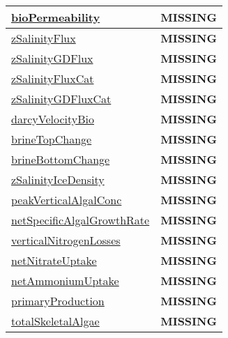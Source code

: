 {\begin{center}
\begin{longtable}{| p{2.0in} | p{4.0in} |}
    \hline
    \hyperref[subsec:var_sec_biogeochemistry_bioPermeability]{bioPermeability} & {\bf \color{red} MISSING} \\
    \hline
    \hyperref[subsec:var_sec_biogeochemistry_zSalinityFlux]{zSalinityFlux} & {\bf \color{red} MISSING} \\
    \hline
    \hyperref[subsec:var_sec_biogeochemistry_zSalinityGDFlux]{zSalinityGDFlux} & {\bf \color{red} MISSING} \\
    \hline
    \hyperref[subsec:var_sec_biogeochemistry_zSalinityFluxCat]{zSalinityFluxCat} & {\bf \color{red} MISSING} \\
    \hline
    \hyperref[subsec:var_sec_biogeochemistry_zSalinityGDFluxCat]{zSalinityGDFluxCat} & {\bf \color{red} MISSING} \\
    \hline
    \hyperref[subsec:var_sec_biogeochemistry_darcyVelocityBio]{darcyVelocityBio} & {\bf \color{red} MISSING} \\
    \hline
    \hyperref[subsec:var_sec_biogeochemistry_brineTopChange]{brineTopChange} & {\bf \color{red} MISSING} \\
    \hline
    \hyperref[subsec:var_sec_biogeochemistry_brineBottomChange]{brineBottomChange} & {\bf \color{red} MISSING} \\
    \hline
    \hyperref[subsec:var_sec_biogeochemistry_zSalinityIceDensity]{zSalinityIceDensity} & {\bf \color{red} MISSING} \\
    \hline
    \hyperref[subsec:var_sec_biogeochemistry_peakVerticalAlgalConc]{peakVerticalAlgalConc} & {\bf \color{red} MISSING} \\
    \hline
    \hyperref[subsec:var_sec_biogeochemistry_netSpecificAlgalGrowthRate]{netSpecificAlgalGrowthRate} & {\bf \color{red} MISSING} \\
    \hline
    \hyperref[subsec:var_sec_biogeochemistry_verticalNitrogenLosses]{verticalNitrogenLosses} & {\bf \color{red} MISSING} \\
    \hline
    \hyperref[subsec:var_sec_biogeochemistry_netNitrateUptake]{netNitrateUptake} & {\bf \color{red} MISSING} \\
    \hline
    \hyperref[subsec:var_sec_biogeochemistry_netAmmoniumUptake]{netAmmoniumUptake} & {\bf \color{red} MISSING} \\
    \hline
    \hyperref[subsec:var_sec_biogeochemistry_primaryProduction]{primaryProduction} & {\bf \color{red} MISSING} \\
    \hline
    \hyperref[subsec:var_sec_biogeochemistry_totalSkeletalAlgae]{totalSkeletalAlgae} & {\bf \color{red} MISSING} \\

\end{longtable}
\end{center}}
